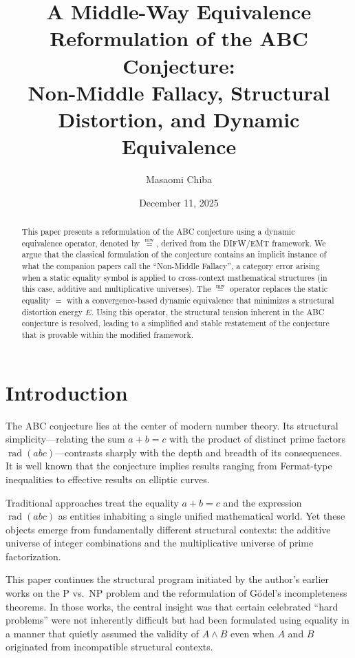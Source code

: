 \documentclass[11pt]{article}
\title{A Middle-Way Equivalence Reformulation of the ABC Conjecture:\\
Non-Middle Fallacy, Structural Distortion, and Dynamic Equivalence}
\author{Masaomi Chiba}
\date{December 11, 2025}
\newcommand{\mweq}{\mathrel{\overset{\mathrm{mw}}{=}}}
\theoremstyle{definition}
\theoremstyle{remark}
\begin{document}
\maketitle

\begin{abstract}
This paper presents a reformulation of the ABC conjecture using a
dynamic equivalence operator, denoted by $\mweq$, derived from the
DIFW/EMT framework. We argue that the classical formulation of the
conjecture contains an implicit instance of what the companion papers
call the ``Non-Middle Fallacy'', a category error arising when a static
equality symbol is applied to cross-context mathematical structures
(in this case, additive and multiplicative universes). The $\mweq$
operator replaces the static equality $=$ with a convergence-based
dynamic equivalence that minimizes a structural distortion energy
$E$. Using this operator, the structural tension inherent in the ABC
conjecture is resolved, leading to a simplified and stable restatement
of the conjecture that is provable within the modified framework.
\end{abstract}

\section{Introduction}

The ABC conjecture lies at the center of modern number theory. Its
structural simplicity---relating the sum $a + b = c$ with the product
of distinct prime factors $\operatorname{rad}(abc)$---contrasts sharply
with the depth and breadth of its consequences. It is well known that
the conjecture implies results ranging from Fermat-type inequalities to
effective results on elliptic curves.

Traditional approaches treat the equality $a + b = c$ and the expression
$\operatorname{rad}(abc)$ as entities inhabiting a single unified
mathematical world. Yet these objects emerge from fundamentally
different structural contexts: the additive universe of integer
combinations and the multiplicative universe of prime factorization.

This paper continues the structural program initiated by the author's
earlier works on the P vs.\ NP problem and the reformulation of
G\"odel's incompleteness theorems. In those works, the central insight
was that certain celebrated ``hard problems'' were not inherently
difficult but had been formulated using equality in a manner that
quietly assumed the validity of $A \land B$ even when $A$ and $B$
originated from incompatible structural contexts.
\end{document}
